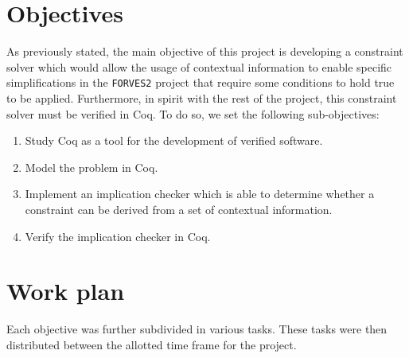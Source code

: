 \section{Objectives}
\label{sect:objectives}

As previously stated, the main objective of this project is developing a constraint solver which would
allow the usage of contextual information to enable specific simplifications in the \verb|FORVES2| project
that require some conditions to hold true to be applied. Furthermore, in spirit with the rest of the
project, this constraint solver must be verified in Coq. To do so, we set the following sub-objectives:

\begin{enumerate}
    \item Study Coq as a tool for the development of verified software.
    \item Model the problem in Coq.
    \item Implement an implication checker which is able to determine whether a constraint can be derived from a set of contextual information.
    \item Verify the implication checker in Coq.
\end{enumerate}

\section{Work plan}
\label{sect:work-plan}

Each objective was further subdivided in various tasks. These tasks were then distributed between the 
allotted time frame for the project.

